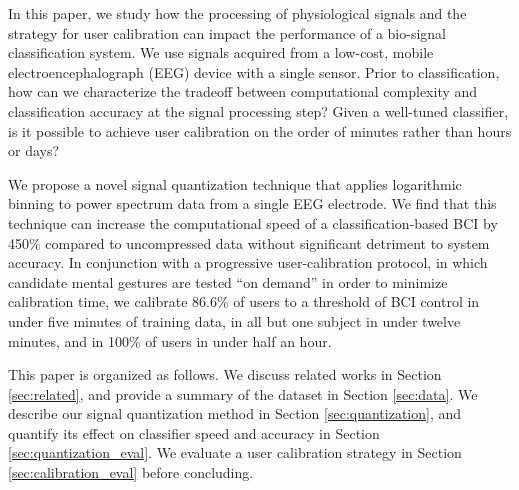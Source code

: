 
In this paper, we study how the processing of physiological signals and the strategy for user calibration can impact the performance of a bio-signal classification system. We use signals acquired from a low-cost, mobile electroencephalograph (EEG) device with a single sensor. Prior to classification, how can we characterize the tradeoff between computational complexity and classification accuracy at the signal processing step? Given a well-tuned classifier, is it possible to achieve user calibration on the order of minutes rather than hours or days?


We propose a novel signal quantization technique that applies logarithmic binning to power spectrum data from a single EEG electrode. We find that this technique can increase the computational speed of a classification-based BCI by 450\% compared to uncompressed data without significant detriment to system accuracy. In conjunction with a progressive user-calibration protocol, in which candidate mental gestures are tested ``on demand'' in order to minimize calibration time, we calibrate 86.6\% of users to a threshold of BCI control in under five minutes of training data, in all but one subject in under twelve minutes, and in 100\% of users in under half an hour. 

This paper is organized as follows. We discuss related works in Section \ref{sec:related}, and provide a summary of the dataset in Section \ref{sec:data}. We describe our signal quantization method in Section \ref{sec:quantization}, and quantify its effect on classifier speed and accuracy in Section \ref{sec:quantization_eval}. We evaluate a user calibration strategy in Section \ref{sec:calibration_eval} before concluding.
